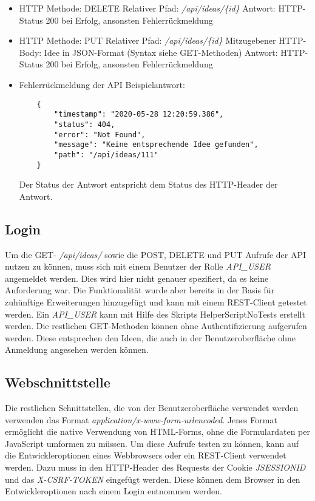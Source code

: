 \begin{itemize}
    \item HTTP Methode: DELETE
    \subitem Relativer Pfad: \textit{/api/ideas/\{id\}}
    \subitem Antwort: HTTP-Status 200 bei Erfolg, ansonsten Fehlerrückmeldung
\end{itemize}

\begin{itemize}
    \item HTTP Methode: PUT
    \subitem Relativer Pfad: \textit{/api/ideas/\{id\}}
    \subitem Mitzugebener HTTP-Body: Idee in JSON-Format (Syntax siehe GET-Methoden)
    \subitem Antwort: HTTP-Status 200 bei Erfolg, ansonsten Fehlerrückmeldung
\end{itemize}

\begin{itemize}
    \item Fehlerrückmeldung der API
    \subitem Beispielantwort:
    \begin{verbatim}
    {
        "timestamp": "2020-05-28 12:20:59.386",
        "status": 404,
        "error": "Not Found",
        "message": "Keine entsprechende Idee gefunden",
        "path": "/api/ideas/111"
    }
    \end{verbatim}
    \subitem Der Status der Antwort entspricht dem Status des HTTP-Header der Antwort.
\end{itemize}

\subsection{Login}
Um die GET- \textit{/api/ideas/} sowie die POST, DELETE und PUT Aufrufe der API nutzen zu können, muss sich mit einem Benutzer der Rolle \textit{API\_USER} angemeldet werden.
Dies wird hier nicht genauer spezifiert, da es keine Anforderung war.
Die Funktionalität wurde aber bereits in der Basis für zuhünftige Erweiterungen hinzugefügt und kann mit einem REST-Client getestet werden.
Ein \textit{API\_USER} kann mit Hilfe des Skripts HelperScriptNoTests erstellt werden.
Die restlichen GET-Methoden können ohne Authentifizierung aufgerufen werden. Diese entsprechen den Ideen, die auch in der Benutzeroberfläche ohne Anmeldung angesehen werden können.

\subsection{Webschnittstelle}
Die restlichen Schnittstellen, die von der Benutzeroberfläche verwendet werden verwenden das Format \textit{application/x-www-form-urlencoded}.
Jenes Format ermöglicht die native Verwendung von HTML-Forms, ohne die Formulardaten per JavaScript umformen zu müssen.
Um diese Aufrufe testen zu können, kann auf die Entwickleroptionen eines Webbrowsers oder ein REST-Client verwendet werden.
Dazu muss in den HTTP-Header des Requests der Cookie \textit{JSESSIONID} und das \textit{X-CSRF-TOKEN} eingefügt werden.
Diese können dem Browser in den Entwickleroptionen nach einem Login entnommen werden.